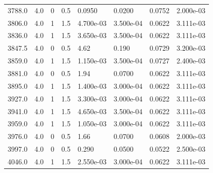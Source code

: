 \documentclass[preview]{standalone}
\begin{document}
{{{\begin{tabular}{L{1.2cm}C{1.2cm} C{0.3cm}C{0.5cm} C{1.4cm}C{1.4cm} C{1.4cm}C{1.4cm}}
  3788.0  &   4.0  & 0     & 0.5 &  0.0950  & 0.0200  & 0.0752 &  2.000e-03   \\ 
  3806.0  &   4.0  & 1     & 1.5 &  4.700e-03  & 3.500e-04  & 0.0622 &  3.111e-03   \\ 
  3836.0  &   4.0  & 1     & 1.5 &  3.650e-03  & 3.500e-04  & 0.0622 &  3.111e-03   \\ 
  3847.5  &   4.0  & 0     & 0.5 &  4.62  & 0.190  & 0.0729 &  3.200e-03   \\ 
  3859.0  &   4.0  & 1     & 1.5 &  1.150e-03  & 3.500e-04  & 0.0727 &  2.400e-03   \\ 
  3881.0  &   4.0  & 0     & 0.5 &  1.94  & 0.0700  & 0.0622 &  3.111e-03   \\ 
  3895.0  &   4.0  & 1     & 1.5 &  1.400e-03  & 3.000e-04  & 0.0622 &  3.111e-03   \\ 
  3927.0  &   4.0  & 1     & 1.5 &  3.300e-03  & 3.000e-04  & 0.0622 &  3.111e-03   \\ 
  3941.0  &   4.0  & 1     & 1.5 &  4.650e-03  & 3.500e-04  & 0.0622 &  3.111e-03   \\ 
  3959.0  &   4.0  & 1     & 1.5 &  1.050e-03  & 3.000e-04  & 0.0622 &  3.111e-03   \\ 
  3976.0  &   4.0  & 0     & 0.5 &  1.66  & 0.0700  & 0.0608 &  2.000e-03   \\ 
  3997.0  &   4.0  & 0     & 0.5 &  0.290  & 0.0500  & 0.0522 &  2.500e-03   \\ 
  4046.0  &   4.0  & 1     & 1.5 &  2.550e-03  & 3.000e-04  & 0.0622 &  3.111e-03   \\ 
\hline 
\end{tabular} 

}}}
\end{document}
